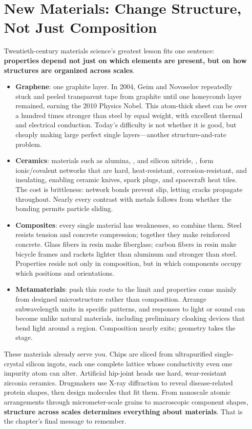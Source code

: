 \section{New Materials: Change Structure, Not Just Composition}

Twentieth-century materials science's greatest lesson fits one sentence: \textbf{properties depend not just on which elements are present, but on how structures are organized across scales}.

\begin{itemize}[itemsep=2pt]
\item \textbf{Graphene}: one graphite layer. In 2004, Geim and Novoselov repeatedly stuck and peeled transparent tape from graphite until one honeycomb layer remained, earning the 2010 Physics Nobel. This atom-thick sheet can be over a hundred times stronger than steel by equal weight, with excellent thermal and electrical conduction. Today's difficulty is not whether it is good, but cheaply making large perfect single layers---another structure-and-rate problem.
\item \textbf{Ceramics}: materials such as alumina, , and silicon nitride, , form ionic/covalent networks that are hard, heat-resistant, corrosion-resistant, and insulating, enabling ceramic knives, spark plugs, and spacecraft heat tiles. The cost is brittleness: network bonds prevent slip, letting cracks propagate throughout. Nearly every contrast with metals follows from whether the bonding permits particle sliding.
\item \textbf{Composites}: every single material has weaknesses, so combine them. Steel resists tension and concrete compression; together they make reinforced concrete. Glass fibers in resin make fiberglass; carbon fibers in resin make bicycle frames and rackets lighter than aluminum and stronger than steel. Properties reside not only in composition, but in which components occupy which positions and orientations.
\item \textbf{Metamaterials}: push this route to the limit and properties come mainly from designed microstructure rather than composition. Arrange subwavelength units in specific patterns, and responses to light or sound can become unlike natural materials, including preliminary cloaking devices that bend light around a region. Composition nearly exits; geometry takes the stage.
\end{itemize}

These materials already serve you. Chips are sliced from ultrapurified single-crystal silicon ingots, each one complete lattice whose conductivity even one impurity atom can alter. Artificial hip-joint heads use hard, wear-resistant zirconia ceramics. Drugmakers use X-ray diffraction to reveal disease-related protein shapes, then design molecules that fit them. From nanoscale atomic arrangements through micrometer-scale grains to macroscopic component shapes, \textbf{structure across scales determines everything about materials}. That is the chapter's final message to remember.

